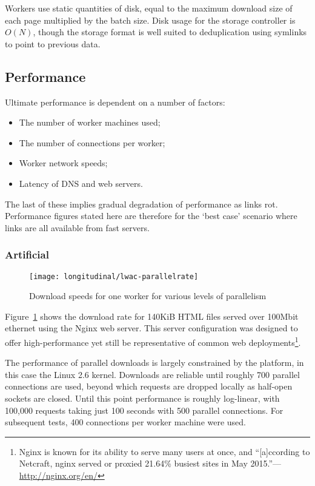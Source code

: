 Workers use static quantities of disk, equal to the maximum download size of each page multiplied by the batch size.  Disk usage for the storage controller is $O(N)$,  though the storage format is well suited to deduplication using symlinks to point to previous data.


\subsection{Performance}
Ultimate performance is dependent on a number of factors:

\begin{itemize}
    \item The number of worker machines used;
    \item The number of connections per worker;
    \item Worker network speeds;
    \item Latency of DNS and web servers.
\end{itemize}

The last of these implies gradual degradation of performance as links rot.  Performance figures stated here are therefore for the `best case' scenario where links are all available from fast servers.


\subsubsection{Artificial}


\begin{figure}[ht]
    \centering
    \texttt{[image: longitudinal/lwac-parallelrate]}
    \caption{Download speeds for one worker for various levels of parallelism}
    \label{fig:longitudinal:lwac:parallelrate}
\end{figure}

Figure~\ref{fig:longitudinal:lwac:parallelrate} shows the download rate for 140KiB HTML files served over 100Mbit ethernet using the Nginx web server.  This server configuration was designed to offer high-performance yet still be representative of common web deployments\footnote{Nginx is known for its ability to serve many users at once, and ``[a]ccording to Netcraft, nginx served or proxied 21.64\% busiest sites in May 2015.''---\url{http://nginx.org/en/}}.

The performance of parallel downloads is largely constrained by the platform, in this case the Linux 2.6 kernel.  Downloads are reliable until roughly 700 parallel connections are used, beyond which requests are dropped locally as half-open sockets are closed.  Until this point performance is roughly log-linear, with 100,000 requests taking just 100 seconds with 500 parallel connections.  For subsequent tests, 400 connections per worker machine were used.


